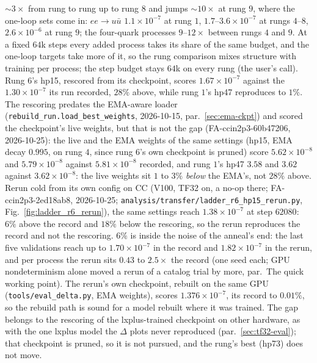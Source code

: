\documentclass[11pt]{article}
\newcommand{\code}[1]{\texttt{#1}}
\begin{document}
$\sim3\times$ from rung to rung up to rung $8$ and jumps $\sim10\times$ at rung $9$, where the one-loop sets come in:
$ee\to u\bar u$ $1.1\times10^{-7}$ at rung $1$, $1.7$--$3.6\times10^{-7}$ at rungs $4$--$8$, $2.6\times10^{-6}$ at rung
$9$; the four-quark processes $9$--$12\times$ between rungs $4$ and $9$. At a fixed $64$k steps every added process takes
its share of the same budget, and the one-loop targets take more of it, so the rung comparison mixes structure with
training per process; the step budget stays $64$k on every rung (the user's call).
Rung $6$'s hp15, rescored from its checkpoint, scores $1.67\times10^{-7}$ against the $1.30\times10^{-7}$ its run
recorded, $28\%$ above, while rung $1$'s hp47 reproduces to $1\%$. The rescoring predates the EMA-aware loader
(\code{rebuild\_run.load\_best\_weights}, 2026-10-15, par.~\ref{sec:ema-ckpt}) and scored the checkpoint's live weights,
but that is not the gap (FA-ccin2p3-60b47206, 2026-10-25): the live and the EMA weights of the same settings (hp15, EMA
decay $0.995$, on rung $4$, since rung $6$'s own checkpoint is pruned) score $5.62\times10^{-8}$ and $5.79\times10^{-8}$
against $5.81\times10^{-8}$ recorded, and rung $1$'s hp47 $3.58$ and $3.62$ against $3.62\times10^{-8}$: the live weights
sit $1$ to $3\%$ \emph{below} the EMA's, not $28\%$ above. Rerun cold from its own config on CC (V100, TF32 on, a
no-op there; FA-ccin2p3-2ed18ab8, 2026-10-25; \code{analysis/transfer/ladder\_r6\_hp15\_rerun.py},
Fig.~\ref{fig:ladder_r6_rerun}), the same settings reach $1.38\times10^{-7}$ at step $62080$: $6\%$ above the record and
$18\%$ below the rescoring, so the rerun reproduces the record and not the rescoring. $6\%$ is inside the noise of the
anneal's end: the last five validations reach up to $1.70\times10^{-7}$ in the record and $1.82\times10^{-7}$ in the
rerun, and per process the rerun sits $0.43$ to $2.5\times$ the record (one seed each; GPU nondeterminism alone moved a
rerun of a catalog trial by more, par.\ The quick working point). The rerun's own checkpoint, rebuilt on the same GPU
(\code{tools/eval\_delta.py}, EMA weights), scores $1.376\times10^{-7}$, its record to $0.01\%$, so the rebuild path is
sound for a model rebuilt where it was trained. The gap belongs to the rescoring of the lxplus-trained checkpoint on
other hardware, as with the one lxplus model the $\Delta$ plots never reproduced (par.~\ref{sec:tf32-eval}); that
checkpoint is pruned, so it is not pursued, and the rung's best (hp73) does not move.
\end{document}
